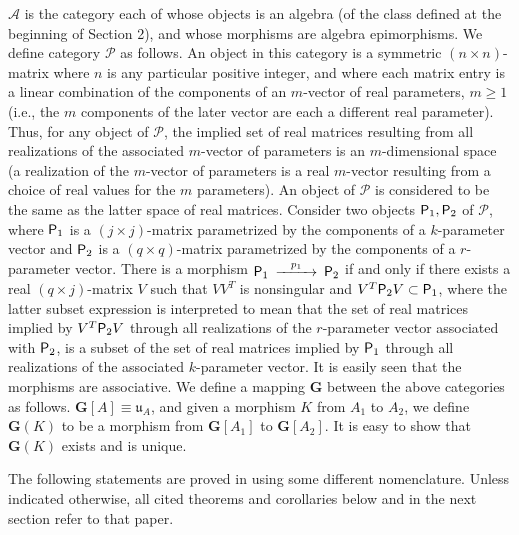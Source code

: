 \documentclass{amsart}
\numberwithin{equation}{section}
\theoremstyle{definition}
\numberwithin{theorem}{section}
\begin{document}
$\mathcal{A}$ is the category each of whose objects is an algebra (of the class defined at the beginning of Section 2), and whose morphisms are algebra epimorphisms.  We define category $\mathcal{P}$ as follows. An object in this category is a symmetric $(n\times n)$-matrix where $n$ is any particular positive integer, and where each matrix entry is a linear combination of the components of an $m$-vector of real parameters, $m\ge 1$ (i.e., the $m$ components of the later vector are each a different real parameter).  Thus, for any object of $\mathcal{P}$, the implied set of real matrices resulting from all realizations of the associated $m$-vector of parameters is an $m$-dimensional space (a realization of the $m$-vector of parameters is a real $m$-vector resulting from a choice of real values for the $m$ parameters).  An object of $\mathcal{P}$ is considered to be the same as the latter space of real matrices.  Consider two objects ${\sf P}_1,{\sf P}_2$ of $\mathcal{P}$, where ${\sf P}_1$ is a $(j\times j)$-matrix parametrized by the components of a $k$-parameter vector and ${\sf P}_2$ is a $(q\times q)$-matrix parametrized by the components of a $r$-parameter vector.  There is a morphism $ \begin{CD}  {\sf P}_1 @>p_1>> {\sf P}_2\end{CD}$ if and only if  there exists a real $(q\times j)$-matrix $V$ such that $VV^T$ is nonsingular and $V^T{\sf P}_2V\subset {\sf P}_1$, where the latter subset expression 
is interpreted to mean that the set of real matrices implied by $V^T{\sf P}_2V$ through all realizations of the $r$-parameter vector associated with ${\sf P}_2$, is a subset of  the set of real matrices implied by  ${\sf P}_1$ through all realizations of the associated $k$-parameter vector.  It is easily seen that the morphisms are associative.  We define a mapping $\mathbf{G}$ between the above categories as follows.  $\mathbf{G}[
A] \equiv \mathfrak{u}_A$, and given a morphism $K$ from $A_1$ to $A_2$, we define $\mathbf{G}(K)$ to be a morphism from $\mathbf{G}[A_1]$ to $\mathbf{G}[A_2]$.  It is easy to show that $\mathbf{G}(K)$ exists and is unique.

 The following statements are proved in \cite{fgreensite:2023} using some different nomenclature.  Unless indicated otherwise, all cited theorems and corollaries below and in the next section refer to that paper.
\end{document}

